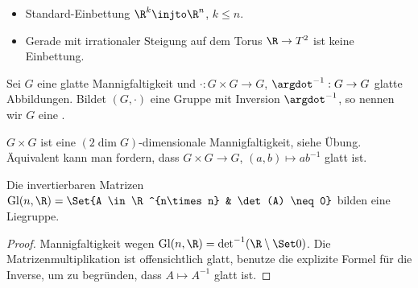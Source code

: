 \begin{ex}
    \begin{itemize}
        \item
            Standard-Einbettung $\R^k \injto \R^n$, $k \le n$.
        \item
            Gerade mit irrationaler Steigung auf dem Torus $\R \to T^2$ ist keine Einbettung.
    \end{itemize}
\end{ex}

\begin{df} \label{2.7}
    Sei $G$ eine glatte Mannigfaltigkeit und $\cdot: G \times G \to G$, $\argdot^{-1}: G \to G$ glatte Abbildungen.
    Bildet $(G, \cdot)$ eine Gruppe mit Inversion $\argdot^{-1}$, so nennen wir $G$ eine .
    \begin{note}
        $G \times G$ ist eine $(2 \dim G)$-dimensionale Mannigfaltigkeit, siehe Übung.
        Äquivalent kann man fordern, dass $G\times G \to G$, $(a,b) \mapsto ab^{-1}$ glatt ist.
    \end{note}
\end{df}

\begin{ex}
    Die invertierbaren Matrizen
    \begin{math}
        \Gl(n,\R) = \Set{A \in \R^{n\times n} & \det(A) \neq 0}
    \end{math}
    bilden eine Liegruppe.
    \begin{proof}
        Mannigfaltigkeit wegen $\Gl(n,\R) = \det^{-1}(\R \setminus \Set 0)$.
        Die Matrizenmultiplikation ist offensichtlich glatt, benutze die explizite Formel für die Inverse, um zu begründen, dass $A \mapsto A^{-1}$ glatt ist.
    \end{proof}
\end{ex}
